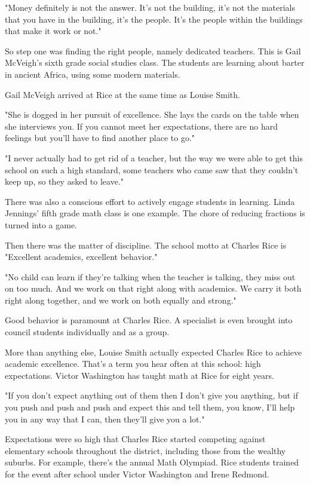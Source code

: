 "Money definitely is not the answer. It's not the building, it's not the materials that you have in the building, it's the people. It's the people within the buildings that make it work or not."

So step one was finding the right people, namely dedicated teachers. This is Gail McVeigh's sixth grade social studies class. The students are learning about barter in ancient Africa, using some modern materials.

Gail McVeigh arrived at Rice at the same time as Louise Smith.

"She is dogged in her pursuit of excellence. She lays the cards on the table when she interviews you. If you cannot meet her expectations, there are no hard feelings but you'll have to find another place to go."

"I never actually had to get rid of a teacher, but the way we were able to get this school on such a high standard, some teachers who came saw that they couldn't keep up, so they asked to leave."

There was also a conscious effort to actively engage students in learning. Linda Jennings' fifth grade math class is one example. The chore of reducing fractions is turned into a game.

Then there was the matter of discipline. The school motto at Charles Rice is "Excellent academics, excellent behavior."

"No child can learn if they're talking when the teacher is talking, they miss out on too much. And we work on that right along with academics. We carry it both right along together, and we work on both equally and strong."

Good behavior is paramount at Charles Rice. A specialist is even brought into council students individually and as a group.

More than anything else, Louise Smith actually expected Charles Rice to achieve academic excellence. That's a term you hear often at this school: high expectations. Victor Washington has taught math at Rice for eight years.

"If you don't expect anything out of them then I don't give you anything, but if you push and push and push and expect this and tell them, you know, I'll help you in any way that I can, then they'll give you a lot."

Expectations were so high that Charles Rice started competing against elementary schools throughout the district, including those from the wealthy suburbs. For example, there's the annual Math Olympiad. Rice students trained for the event after school under Victor Washington and Irene Redmond.

